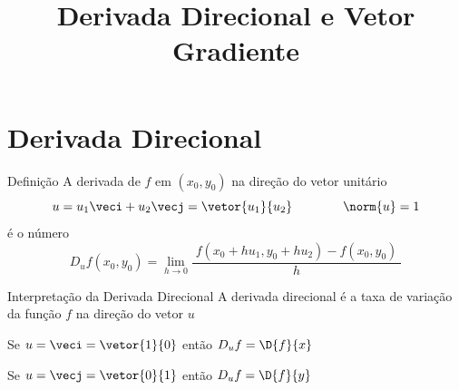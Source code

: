 
\usepackage{calculo_varias_variaveis-1}

\title{Derivada Direcional e Vetor Gradiente}



\addtitle

\section{Derivada Direcional}


\begin{frame}{Definição}
  A derivada de $f$ em $(x_0, y_0)$
  \pause
  na direção do vetor unitário
  \[
    u
    = u_1 \veci + u_2 \vecj
    = \vetor{u_1}{u_2}
    \qquad
    \qquad
    \norm{u} = 1
  \]
  \pause
  é o número
  \[
    D_u f(x_0, y_0)
    = \lim_{h\to 0} \frac{\;f( x_0 + hu_1, y_0 + hu_2)-f(x_0, y_0)\;}{h}
  \]
\end{frame}


\begin{frame}{Interpretação da Derivada Direcional}
  A derivada direcional é a taxa de variação da função $f$ na direção do vetor $u$

  \pause
  \vspace{\baselineskip}
  Se \(u=\veci=\vetor{1}{0}\)
  \pause
  então
  \(
    D_u f = \D{f}{x}
  \)

  \pause
  \vspace{\baselineskip}
  Se \(u=\vecj=\vetor{0}{1}\)
  \pause
  então
  \(
    D_u f = \D{f}{y}
  \)
\end{frame}



